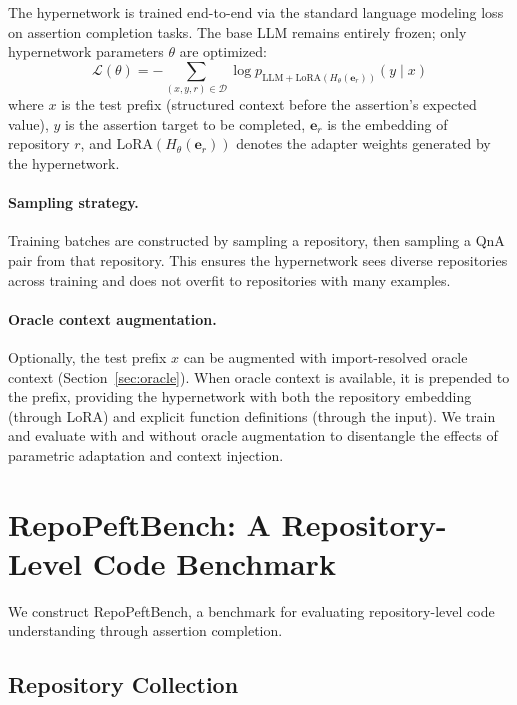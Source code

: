\documentclass[11pt]{article}
\newcommand{\benchmark}{RepoPeftBench}
\begin{document}
The hypernetwork is trained end-to-end via the standard language modeling loss on assertion completion tasks.
The base LLM remains entirely frozen; only hypernetwork parameters $\theta$ are optimized:
\begin{equation}
    \mathcal{L}(\theta) = -\sum_{(x,y,r) \in \mathcal{D}} \log p_{\text{LLM} + \text{LoRA}(H_\theta(\mathbf{e}_r))}(y \mid x)
\label{eq:training_loss}
\end{equation}
where $x$ is the test prefix (structured context before the assertion's expected value), $y$ is the assertion target to be completed, $\mathbf{e}_r$ is the embedding of repository $r$, and $\text{LoRA}(H_\theta(\mathbf{e}_r))$ denotes the adapter weights generated by the hypernetwork.

\paragraph{Sampling strategy.}
Training batches are constructed by sampling a repository, then sampling a QnA pair from that repository.
This ensures the hypernetwork sees diverse repositories across training and does not overfit to repositories with many examples.

\paragraph{Oracle context augmentation.}
Optionally, the test prefix $x$ can be augmented with import-resolved oracle context (Section~\ref{sec:oracle}).
When oracle context is available, it is prepended to the prefix, providing the hypernetwork with both the repository embedding (through LoRA) and explicit function definitions (through the input).
We train and evaluate with and without oracle augmentation to disentangle the effects of parametric adaptation and context injection.

\section{\benchmark{}: A Repository-Level Code Benchmark}
\label{sec:benchmark}

We construct \benchmark{}, a benchmark for evaluating repository-level code understanding through assertion completion.

\subsection{Repository Collection}
\end{document}
